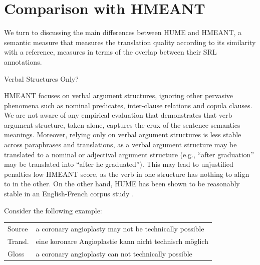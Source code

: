 \documentclass[11pt,letterpaper]{article}
\makeatletter
\renewcommand{\paragraph}{
  \@startsection{paragraph}{4}
  {\z@}{.1ex \@plus .1ex \@minus .1ex}{-1.5em}
  {\normalfont\normalsize\bfseries}
}
\makeatother
\begin{document}
\section{Comparison with HMEANT}\label{sec:hmeant_comp}

We turn to discussing the main differences between HUME and HMEANT,
a semantic measure that measures the translation quality according to its similarity
with a reference, measures in terms of the overlap between their SRL annotations.

\paragraph{Verbal Structures Only?}

HMEANT focuses on verbal
argument structures, ignoring other pervasive phenomena such as nominal predicates, inter-clause
relations and copula clauses.
We are not aware of any empirical evaluation that demonstrates that verb argument structure,
taken alone, captures the crux of the sentence semantics meanings.
Moreover, relying only on verbal argument structures is less stable across paraphrases
and translations, as a verbal argument structure
may be translated to a nominal or adjectival argument structure
(e.g., ``after graduation'' may be translated into ``after he graduated'').
This may lead to unjustified penalties low HMEANT score, as the verb
in one structure has nothing to align to in the other.
On the other hand, HUME has been shown to be reasonably stable in an English-French
corpus study \cite{sulem2015conceptual}.

Consider the following example:

\vspace{-.3em}
\begin{center}
\begin{tabular}{lp{5.4cm}}
Source & \small a coronary angioplasty may not be technically possible \\
Transl.& \small eine koronare Angioplastie kann nicht technisch m{\"o}glich \\
Gloss & \small a coronary angioplasty can not technically possible \\
\end{tabular}
\end{center}
\vspace{-.5em}
\end{document}
